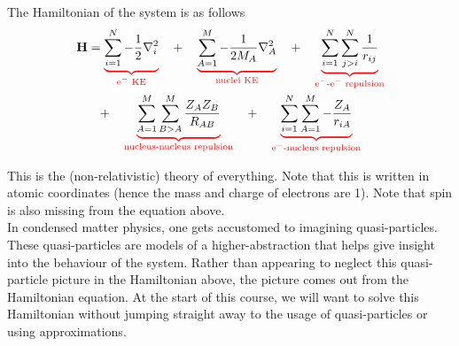 \documentclass[12pt,a4paper,titlepage]{article}
\newcommand{\trm}[1]{\textrm{#1}} %
\begin{document}
\begin{center}
\end{center}

The Hamiltonian of the system is as follows
\begin{equation}
\begin{aligned}
\vb{H}&=\color{red}\underbrace{\color{black}\sum_{i=1}^{N}-\frac{1}{2}\nabla_{i}^{2}}_{\trm{e$^{-}$ KE}}\quad{\color{black}+}\quad\underbrace{\color{black}\sum_{A=1}^{M}-\frac{1}{2M_{A}}\nabla_{A}^{2}}_{\trm{nuclei KE}}\quad{\color{black}+}\quad\underbrace{\color{black}\sum_{i=1}^{N}\sum_{j>i}^{N}\frac{1}{r_{ij}}}_{\trm{e$^{-}$-e$^{-}$ repulsion}}\\
&\color{red}\quad{\color{black}+}\quad\underbrace{\color{black}\sum_{A=1}^{M}\sum_{B>A}^{M}\frac{Z_{A}Z_{B}}{R_{AB}}}_{\trm{nucleus-nucleus repulsion}}\quad{\color{black}+}\quad\underbrace{\color{black}\sum_{i=1}^{N}\sum_{A=1}^{M}-\frac{Z_{A}}{r_{iA}}}_{\trm{e$^{-}$-nucleus repulsion}}
\end{aligned}
\end{equation}

This is the (non-relativistic) theory of everything. Note that this is written in atomic coordinates (hence the mass and charge of electrons are 1). Note that spin is also missing from the equation above.\\

In condensed matter physics, one gets accustomed to imagining quasi-particles. These quasi-particles are models of a higher-abstraction that helps give insight into the behaviour of the system. Rather than appearing to neglect this quasi-particle picture in the Hamiltonian above, the picture comes out from the Hamiltonian equation. At the start of this course, we will want to solve this Hamiltonian without jumping straight away to the usage of quasi-particles or using approximations.\\
\end{document}
